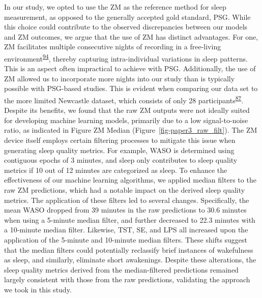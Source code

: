 \documentclass[
  9pt,
]{scrbook}
\begin{document}
In our study, we opted to use the ZM as the reference method for sleep
measurement, as opposed to the generally accepted gold standard, PSG.
While this choice could contribute to the observed discrepancies between
our models and ZM outcomes, we argue that the use of ZM has distinct
advantages. For one, ZM facilitates multiple consecutive nights of
recording in a free-living
environment\textsuperscript{\protect\hyperlink{ref-pedersen_self-administered_2021}{94}},
thereby capturing intra-individual variations in sleep patterns. This is
an aspect often impractical to achieve with PSG. Additionally, the use
of ZM allowed us to incorporate more nights into our study than is
typically possible with PSG-based studies. This is evident when
comparing our data set to the more limited Newcastle dataset, which
consists of only 28
participants\textsuperscript{\protect\hyperlink{ref-hees_novel_2015}{87}}.
Despite its benefits, we found that the raw ZM outputs were not ideally
suited for developing machine learning models, primarily due to a low
signal-to-noise ratio, as indicated in Figure ZM Median
(Figure~\ref{fig-paper3_raw_filt}). The ZM device itself employs certain
filtering processes to mitigate this issue when generating sleep quality
metrics. For example, WASO is determined using contiguous epochs of 3
minutes, and sleep only contributes to sleep quality metrics if 10 out
of 12 minutes are categorized as sleep. To enhance the effectiveness of
our machine learning algorithms, we applied median filters to the raw ZM
predictions, which had a notable impact on the derived sleep quality
metrics. The application of these filters led to several changes.
Specifically, the mean WASO dropped from 39 minutes in the raw
predictions to 30.6 minutes when using a 5-minute median filter, and
further decreased to 22.3 minutes with a 10-minute median filter.
Likewise, TST, SE, and LPS all increased upon the application of the
5-minute and 10-minute median filters. These shifts suggest that the
median filters could potentially reclassify brief instances of
wakefulness as sleep, and similarly, eliminate short awakenings. Despite
these alterations, the sleep quality metrics derived from the
median-filtered predictions remained largely consistent with those from
the raw predictions, validating the approach we took in this study.
\end{document}
